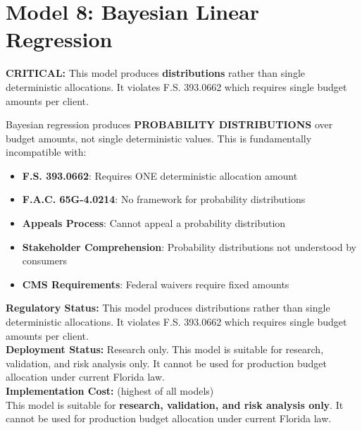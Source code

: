 \chapter{Model 8: Bayesian Linear Regression}\label{ch:model8}





\begin{tcolorbox}[colback=red!10!white, colframe=red!75!black, title=\textbf{REGULATORY WARNING: NOT COMPLIANT}]
\textbf{CRITICAL:} This model produces \textbf{distributions} rather than single deterministic allocations. It violates F.S. 393.0662 which requires single budget amounts per client. 

Bayesian regression produces \textbf{PROBABILITY DISTRIBUTIONS} over budget amounts, not single deterministic values. This is fundamentally incompatible with:

\begin{itemize}
    \item \textbf{F.S. 393.0662}: Requires ONE deterministic allocation amount
    \item \textbf{F.A.C. 65G-4.0214}: No framework for probability distributions
    \item \textbf{Appeals Process}: Cannot appeal a probability distribution
    \item \textbf{Stakeholder Comprehension}: Probability distributions not understood by consumers
    \item \textbf{CMS Requirements}: Federal waivers require fixed amounts
\end{itemize}

\textbf{Regulatory Status:} This model produces distributions rather than single deterministic allocations. It violates F.S. 393.0662 which requires single budget amounts per client. \\
\textbf{Deployment Status:} Research only. This model is suitable for research, validation, and risk analysis only. It cannot be used for production budget allocation under current Florida law. \\
\textbf{Implementation Cost:} \ModelEightThreeYearTCO{} (highest of all models) \\

\vspace{0.1cm}
This model is suitable for \textbf{research, validation, and risk analysis only}. It cannot be used for production budget allocation under current Florida law.

\end{tcolorbox}

